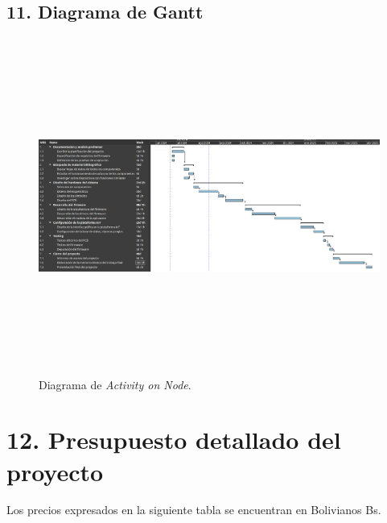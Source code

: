 \documentclass[
11pt, %
codirector, %
]{charter}
\begin{document}
\newpage
\begin{landscape}
\section{11. Diagrama de Gantt}
\label{sec:gantt}
\begin{figure}[htpb]
	\centering 
	\includegraphics[width=24cm, height=11cm]{./Figuras/ganntfinal2.png}
	\caption{Diagrama de \textit{Activity on Node}.}
	\label{fig:d_gantt}
\end{figure}
\end{landscape}

\section{12. Presupuesto detallado del proyecto}
\label{sec:presupuesto}
Los precios expresados en la siguiente tabla se encuentran en Bolivianos Bs.
\end{document}
